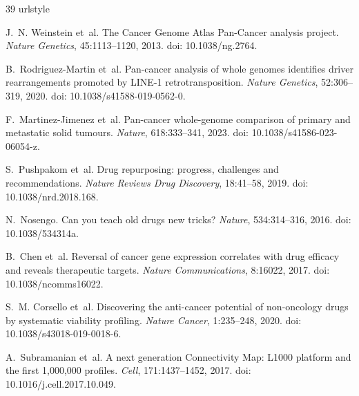\FloatBarrier
\begin{thebibliography}{39}
\providecommand{\natexlab}[1]{#1}
\providecommand{\url}[1]{\texttt{#1}}
\expandafter\ifx\csname urlstyle\endcsname\relax
  \providecommand{\doi}[1]{doi: #1}\else
  \providecommand{\doi}{doi: \begingroup \urlstyle{rm}\Url}\fi

J.~N. Weinstein et~al.
\newblock The Cancer Genome Atlas Pan-Cancer analysis project.
\newblock \emph{Nature Genetics}, 45:1113--1120, 2013.
\newblock \doi{10.1038/ng.2764}.

B.~Rodriguez-Martin et~al.
\newblock Pan-cancer analysis of whole genomes identifies driver rearrangements promoted by LINE-1 retrotransposition.
\newblock \emph{Nature Genetics}, 52:306--319, 2020.
\newblock \doi{10.1038/s41588-019-0562-0}.

F.~Martinez-Jimenez et~al.
\newblock Pan-cancer whole-genome comparison of primary and metastatic solid tumours.
\newblock \emph{Nature}, 618:333--341, 2023.
\newblock \doi{10.1038/s41586-023-06054-z}.

S.~Pushpakom et~al.
\newblock Drug repurposing: progress, challenges and recommendations.
\newblock \emph{Nature Reviews Drug Discovery}, 18:41--58, 2019.
\newblock \doi{10.1038/nrd.2018.168}.

N.~Nosengo.
\newblock Can you teach old drugs new tricks?
\newblock \emph{Nature}, 534:314--316, 2016.
\newblock \doi{10.1038/534314a}.

B.~Chen et~al.
\newblock Reversal of cancer gene expression correlates with drug efficacy and reveals therapeutic targets.
\newblock \emph{Nature Communications}, 8:16022, 2017.
\newblock \doi{10.1038/ncomms16022}.

S.~M. Corsello et~al.
\newblock Discovering the anti-cancer potential of non-oncology drugs by systematic viability profiling.
\newblock \emph{Nature Cancer}, 1:235--248, 2020.
\newblock \doi{10.1038/s43018-019-0018-6}.

A.~Subramanian et~al.
\newblock A next generation Connectivity Map: L1000 platform and the first 1,000,000 profiles.
\newblock \emph{Cell}, 171:1437--1452, 2017.
\newblock \doi{10.1016/j.cell.2017.10.049}.


\end{thebibliography}
